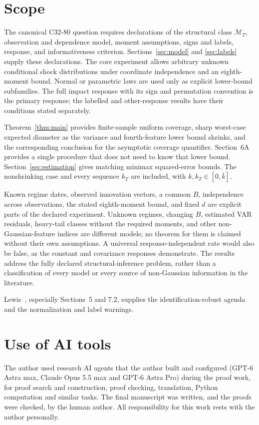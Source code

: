 \documentclass[11pt,a4paper]{article}
\numberwithin{equation}{section}
\newcommand{\cM}{\mathcal M}
\begin{document}
\section{Scope}\label{sec:scope}
The canonical C32-80 question requires declarations of the structural
class \(\cM_T\), observation and dependence model, moment assumptions,
signs and labels, response, and informativeness criterion.
Sections~\ref{sec:model} and \ref{sec:labels} supply these declarations.
The core experiment allows arbitrary unknown conditional shock
distributions under coordinate independence and an eighth-moment bound.
Normal or parametric laws are used only as explicit lower-bound
subfamilies. The full impact response with its sign and permutation
convention is the primary response; the labelled and other-response
results have their conditions stated separately.

Theorem~\ref{thm:main} provides finite-sample uniform coverage, sharp
worst-case expected diameter as the variance and fourth-feature lower
bound shrinks, and the corresponding conclusion for the
asymptotic coverage quantifier.
Section~6A provides a single procedure that does not need to know that
lower bound. Section~\ref{sec:estimation} gives matching minimax
squared-error bounds. The nonshrinking case and every sequence \(k_T\)
are included, with \(k,k_T\in[0,\bar k]\).

Known regime dates, observed innovation vectors, a common \(B\),
independence across observations, the stated eighth-moment bound, and
fixed \(d\) are explicit parts of the declared experiment.
Unknown regimes, changing \(B\), estimated VAR residuals, heavy-tail
classes without the required moments, and other non-Gaussian-feature
indices are different models; no theorem for them is claimed without
their own assumptions. A universal response-independent rate would
also be false, as the constant and covariance responses demonstrate.
The results address the fully declared structural-inference problem,
rather than a classification of
every model or every source of non-Gaussian information in the literature.

Lewis~\cite{Lewis2025}, especially Sections~5 and 7.2, supplies the
identification-robust agenda and the normalization and label warnings.

\section*{Use of AI tools}
The author used research AI agents that the author built and configured (GPT-6 Astra max,
Claude Opus 5.5 max and GPT-6 Astra Pro) during the proof work, for proof search and
construction, proof checking, translation, Python computation and similar tasks. The final
manuscript was written, and the proofs were checked, by the human author. All responsibility
for this work rests with the author personally.
\end{document}
